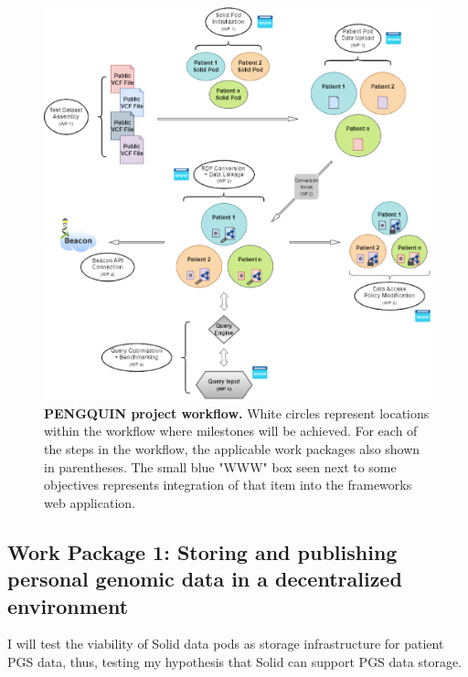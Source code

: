 \documentclass[runningheads]{llncs}
\begin{document}
\begin{figure}
\includegraphics[width=\textwidth]{fig1.eps}
\caption{\textbf{PENGQUIN project workflow.}
White circles represent locations within the workflow where milestones will be achieved. 
For each of the steps in the workflow, the applicable work packages also shown in parentheses. 
The small blue "WWW" box seen next to some objectives represents integration of that item into the framework\textquotesingle s web application.
} \label{fig1}
\end{figure}

\subsection{Work Package 1: Storing and publishing personal genomic data in a decentralized environment} 

I will test the viability of Solid data pods as storage infrastructure for patient PGS data, thus, testing my hypothesis that Solid can support PGS data storage. 
\end{document}
